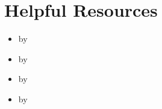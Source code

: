 \documentclass[nodate]{proc}
\begin{document}
\section{Helpful Resources} \label{sec:helpful-resources} 

\begin{itemize}
       \item {} by \textcite{keshav_how_to_read}
       \item {} by \textcite{zobel_writing}
       \item {} by \textcite{knuth_mathematical_writing}
       \item {} by \textcite{winston_how_to_speak}
\end{itemize}

 


\printbibliography
\end{document}
